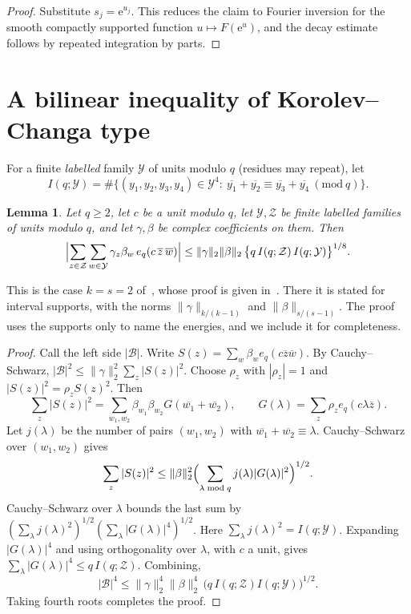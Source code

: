 \documentclass[11pt]{amsart}
\newtheorem{lemma}[theorem]{Lemma}
\theoremstyle{definition}
\theoremstyle{remark}
\numberwithin{equation}{section}
\newcommand{\e}{\mathrm e}
\newcommand{\cB}{\mathcal B}
\newcommand{\inv}[1]{\overline{#1}}
\begin{document}
\begin{proof}
Substitute $s_j=\e^{u_j}$.  This reduces the claim to Fourier inversion for
the smooth compactly supported function $u\mapsto F(\e^{u})$, and the decay
estimate follows by repeated integration by parts.
\end{proof}

\section{A bilinear inequality of Korolev--Changa type}\label{sec:KC}

For a finite \emph{labelled} family $\mathcal Y$ of units modulo $q$ (residues
may repeat), let
\[
 I(q;\mathcal Y)=\#\bigl\{(y_1,y_2,y_3,y_4)\in\mathcal Y^4:\
 \inv{y_1}+\inv{y_2}\equiv\inv{y_3}+\inv{y_4}\ (\mathrm{mod}\ q)\bigr\}.
\]

\begin{lemma}\label{lem:KC}
Let $q\ge2$, let $c$ be a unit modulo $q$, let $\mathcal Y,\mathcal Z$ be
finite labelled families of units modulo $q$, and let $\gamma,\beta$ be
complex coefficients on them.  Then
\[
 \Bigl|\sum_{z\in\mathcal Z}\sum_{w\in\mathcal Y}
 \gamma_z\beta_w\,e_q(c\,\inv z\,\inv w)\Bigr|
 \le\|\gamma\|_2\|\beta\|_2\,
 \bigl\{q\,I(q;\mathcal Z)\,I(q;\mathcal Y)\bigr\}^{1/8}.
\]
\end{lemma}

This is the case $k=s=2$ of~\cite[Lemma~1]{KC}, whose proof is given
in~\cite{Kor18}.  There it is stated for interval supports, with the norms
$\|\gamma\|_{k/(k-1)}$ and $\|\beta\|_{s/(s-1)}$.  The proof uses the supports only to name the energies, and we
include it for completeness.

\begin{proof}
Call the left side $|\cB|$.  Write $S(z)=\sum_w\beta_we_q(c\inv z\inv w)$.
By Cauchy--Schwarz, $|\cB|^2\le\|\gamma\|_2^2\sum_z|S(z)|^2$.  Choose
$\rho_z$ with $|\rho_z|=1$ and $|S(z)|^2=\rho_z S(z)^2$.  Then
\[
 \sum_z|S(z)|^2=\sum_{w_1,w_2}\beta_{w_1}\beta_{w_2}
 G(\inv{w_1}+\inv{w_2}),
 \qquad G(\lambda)=\sum_z\rho_z e_q(c\lambda\inv z).
\]
Let $j(\lambda)$ be the number of pairs $(w_1,w_2)$ with
$\inv{w_1}+\inv{w_2}\equiv\lambda$.  Cauchy--Schwarz over $(w_1,w_2)$ gives
\[
 \sum_z|S(z)|^2\le\|\beta\|_2^2
 \Bigl(\sum_{\lambda\bmod q}j(\lambda)|G(\lambda)|^2\Bigr)^{1/2}.
\]
Cauchy--Schwarz over $\lambda$ bounds the last sum by
$(\sum_\lambda j(\lambda)^2)^{1/2}(\sum_\lambda|G(\lambda)|^4)^{1/2}$.  Here
$\sum_\lambda j(\lambda)^2=I(q;\mathcal Y)$.  Expanding $|G(\lambda)|^4$ and
using orthogonality over $\lambda$, with $c$ a unit, gives
$\sum_\lambda|G(\lambda)|^4\le q\,I(q;\mathcal Z)$.  Combining,
\[
 |\cB|^4\le\|\gamma\|_2^4\|\beta\|_2^4\,
 \bigl(q\,I(q;\mathcal Z)I(q;\mathcal Y)\bigr)^{1/2} .
\]
Taking fourth roots completes the proof.
\end{proof}
\end{document}
